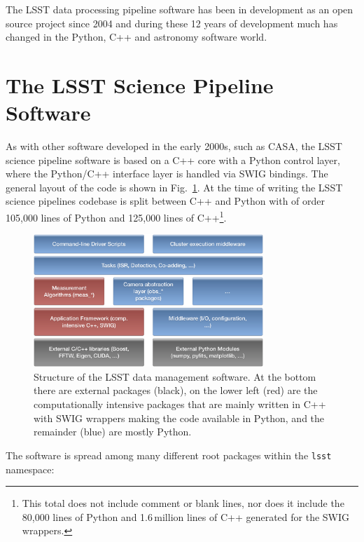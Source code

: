 \documentclass[]{spie}  %
\begin{document}
The LSST data processing pipeline software has been in development as an open source project since 2004\cite{2004AAS...20510811A,2010SPIE.7740E..15A,2016_adassxxv_P056} and during these 12 years of development much has changed in the Python, C++ and astronomy software world.


\section{The LSST Science Pipeline Software}

As with other software developed in the early 2000s, such as CASA\cite{2012ASPC..461..849P}, the LSST science pipeline software is based on a C++ core with a Python control layer, where the Python/C++ interface layer is handled via SWIG\cite{beazley2003automated} bindings.
The general layout of the code is shown in Fig.~\ref{fig:layers}.
At the time of writing the LSST science pipelines codebase is split between C++ and Python with of order 105,000 lines of Python and 125,000 lines of C++\footnote{This total does not include comment or blank lines, nor does it include the 80,000 lines of Python and 1.6\,million lines of C++ generated for the SWIG wrappers.}.

\begin{figure} [t]
\begin{center}
\includegraphics[height=5cm]{Software-Layers}
\end{center}
\caption[layers]
{\label{fig:layers}
Structure of the LSST data management software.
At the bottom there are external packages (black), on the lower left (red) are the computationally intensive packages that are mainly written in C++ with SWIG wrappers making the code available in Python, and the remainder (blue) are mostly Python.}
\end{figure}

The software is spread among many different root packages within the \texttt{lsst} namespace:
\end{document}
